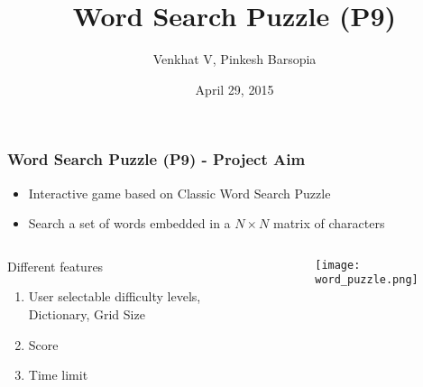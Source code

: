 \documentclass[handout]{beamer}%
\begin{document}
\title{Word Search Puzzle (P9)}  
\author{Venkhat V, Pinkesh Barsopia}
\date{April 29, 2015} 

\begin{frame}
\titlepage
\end{frame}



\begin{frame}\frametitle{Word Search Puzzle (P9) - Project Aim }
\begin{itemize}
 \item Interactive game based on Classic Word Search Puzzle
\item Search a set of words embedded in a $N \times N$ matrix of characters

\end{itemize}
\pause
\begin{columns}[c]
\begin{column}{5cm}
\begin{block}{Different features}
\begin{enumerate}
\item User selectable difficulty levels, Dictionary, Grid Size
\item Score
\item Time limit
\end{enumerate}
\end{block}
\end{column}

\begin{column}{5cm}

\begin{figure}
\texttt{[image: word\_puzzle.png]}

\end{figure}
\end{column}
\end{columns}
\end{frame}
\end{document}
